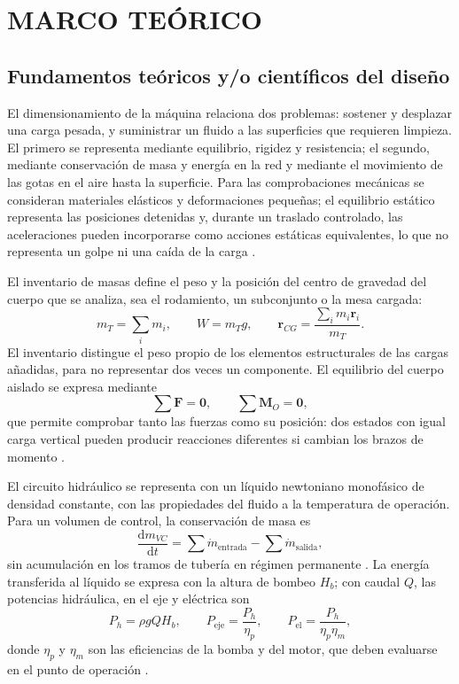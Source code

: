 \chapter{MARCO TEÓRICO}
\label{cap:marco-teorico}

\section{Fundamentos teóricos y/o científicos del diseño}

El dimensionamiento de la máquina relaciona dos problemas: sostener y desplazar una carga pesada, y suministrar un fluido a las superficies que requieren limpieza. El primero se representa mediante equilibrio, rigidez y resistencia; el segundo, mediante conservación de masa y energía en la red y mediante el movimiento de las gotas en el aire hasta la superficie. Para las comprobaciones mecánicas se consideran materiales elásticos y deformaciones pequeñas; el equilibrio estático representa las posiciones detenidas y, durante un traslado controlado, las aceleraciones pueden incorporarse como acciones estáticas equivalentes, lo que no representa un golpe ni una caída de la carga \cite{shigley2015}.

El inventario de masas define el peso y la posición del centro de gravedad del cuerpo que se analiza, sea el rodamiento, un subconjunto o la mesa cargada:
\begin{equation}
  m_T=\sum_i m_i,\qquad W=m_Tg,\qquad
  \mathbf{r}_{CG}=\frac{\sum_i m_i\mathbf{r}_i}{m_T}.
  \label{eq:mt-masas}
\end{equation}
El inventario distingue el peso propio de los elementos estructurales de las cargas añadidas, para no representar dos veces un componente. El equilibrio del cuerpo aislado se expresa mediante
\begin{equation}
  \sum\mathbf{F}=\mathbf{0},\qquad \sum\mathbf{M}_O=\mathbf{0},
  \label{eq:mt-equilibrio}
\end{equation}
que permite comprobar tanto las fuerzas como su posición: dos estados con igual carga vertical pueden producir reacciones diferentes si cambian los brazos de momento \cite{shigley2015}.

El circuito hidráulico se representa con un líquido newtoniano monofásico de densidad constante, con las propiedades del fluido a la temperatura de operación. Para un volumen de control, la conservación de masa es
\begin{equation}
  \frac{\mathrm{d}m_{VC}}{\mathrm{d}t}
  =\sum\dot{m}_{\mathrm{entrada}}-\sum\dot{m}_{\mathrm{salida}},
  \label{eq:mt-balance-masa}
\end{equation}
sin acumulación en los tramos de tubería en régimen permanente \cite{white2016}. La energía transferida al líquido se expresa con la altura de bombeo $H_b$; con caudal $Q$, las potencias hidráulica, en el eje y eléctrica son
\begin{equation}
  P_h=\rho gQH_b,\qquad P_{\mathrm{eje}}=\frac{P_h}{\eta_p},\qquad
  P_{\mathrm{el}}=\frac{P_h}{\eta_p\eta_m},
  \label{eq:teo-potencia}
\end{equation}
donde $\eta_p$ y $\eta_m$ son las eficiencias de la bomba y del motor, que deben evaluarse en el punto de operación \cite{white2016}.

